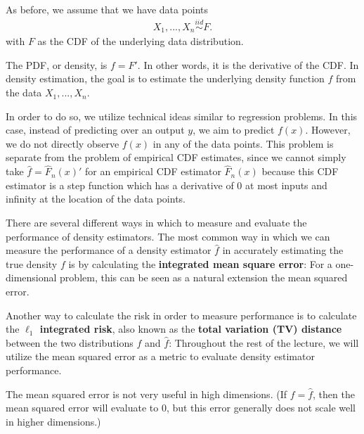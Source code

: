 As before, we assume that we have data points
\begin{align} \nonumber
	X_1, ..., X_n \overset{iid}{\sim} F.
\end{align}
with $F$ as the CDF of the underlying data distribution.

The PDF, or density, is $f = F'$. In other words, it is the derivative of the CDF. In density estimation, the goal is to estimate the underlying density function $f$ from the data $X_1, ..., X_n$.

In order to do so, we utilize technical ideas similar to regression problems. In this case, instead of predicting over an output $y$, we aim to predict $f(x)$. However, we do not directly observe $f(x)$ in any of the data points. This problem is separate from the problem of empirical CDF estimates, since we cannot simply take $\hat{f} = \hat{F}_n(x)'$ for an empirical CDF estimator $\hat{F}_n(x)$ because this CDF estimator is a step function which has a derivative of 0 at most inputs and infinity at the location of the data points.

There are several different ways in which to measure and evaluate the performance of density estimators. The most common way in which we can measure the performance of a density estimator $\hat{f}$ in accurately estimating the true density $f$ is by calculating the \textbf{integrated mean square error}: 
For a one-dimensional problem, this can be seen as a natural extension the mean squared error. 

Another way to calculate the risk in order to measure performance is to calculate the \textbf{$\ell_1$ integrated risk}, also known as the \textbf{total variation (TV) distance} between the two distributions $f$ and $\hat{f}$:
Throughout the rest of the lecture, we will utilize the mean squared error as a metric to evaluate density estimator performance.
\begin{remark} The mean squared error is not very useful in high dimensions. (If $f = \hat{f}$, then the mean squared error will evaluate to 0, but this error generally does not scale well in higher dimensions.)
\end{remark}

